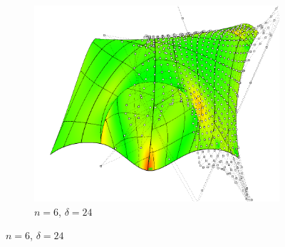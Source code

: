 \documentclass[9pt,academicons]{article}
\begin{document}
\begin{figure}[!ht]
\begin{subfigure}{.33\textwidth}
    \centering
    \includegraphics[width=\textwidth]{images/pocket/spatch1.png}
    \caption{$n=6$, $\delta=24$}
    \label{fig:pocket-6-sp}
  \end{subfigure}


\end{figure}
\end{document}
